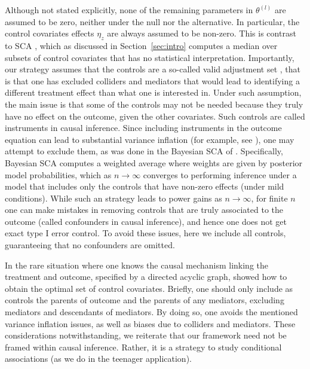 \documentclass[pdflatex,sn-mathphys-num]{sn-jnl}%
\theoremstyle{thmstyleone}%
\theoremstyle{thmstyletwo}%
\theoremstyle{thmstylethree}%
\begin{document}
Although not stated explicitly, none of the remaining parameters in $\theta^{(l)}$ are assumed to be zero, neither under the null nor the alternative.
In particular, the control covariates effects $\eta_z$ are always assumed to be non-zero.
This is contrast to SCA \citep{simonsohn:2020}, %
which as discussed in Section~\ref{sec:intro} computes a median over subsets of control covariates that has no statistical interpretation. 
\color{blue}
Importantly, our strategy assumes that the controls are a so-called valid adjustment set \citep{henckel:2022}, that is
that one has excluded colliders and mediators that would lead to identifying a different treatment effect than what one is interested in.
Under such assumption, the main issue is that some of the controls may not be needed because they truly have no effect on the outcome, given the other covariates. Such controls are called instruments in causal inference.
Since including instruments in the outcome equation can lead to substantial variance inflation (for example, see \cite{papaspiliopoulos:2026}), one may attempt to exclude them, as was done in the Bayesian SCA of \cite{semken:2022}.
Specifically, \color{black} Bayesian SCA computes a weighted average where weights are given by posterior model probabilities, which as $n \to \infty$ converges to performing inference under a model that includes only the controls that have non-zero effects (under mild conditions).
\color{blue} While such an strategy leads to power gains as $n \to \infty$, for finite $n$ one can make mistakes in removing controls that are truly associated to the outcome (called confounders in causal inference), and hence one does not get exact type I error control. To avoid these issues, here we include all controls, guaranteeing that no confounders are omitted.

In the rare situation where one knows the causal mechanism linking the treatment and outcome, specified by a directed acyclic graph, \cite{henckel:2022} showed how to obtain the optimal set of control covariates. %
Briefly, one should only include as controls the parents of outcome and the parents of any mediators, excluding mediators and descendants of mediators.
By doing so, one avoids the mentioned variance inflation issues, as well as biases due to colliders and mediators.
These considerations notwithstanding, we reiterate that our framework need not be framed within causal inference. Rather, it is a strategy to study conditional associations (as we do in the teenager application).
\color{black}
\end{document}
